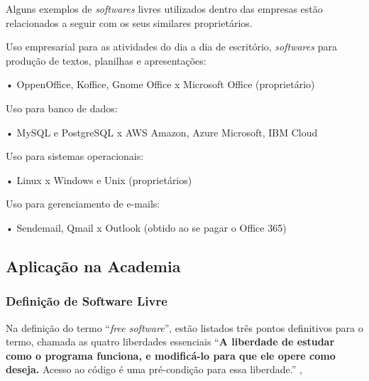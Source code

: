 \documentclass[12pt]{article}
\begin{document}
Alguns exemplos de \textit{softwares} livres utilizados dentro das empresas estão relacionados a seguir com os seus similares proprietários.

Uso empresarial para as atividades do dia a dia de escritório, \textit{softwares} para produção de textos, planilhas e apresentações:

• OppenOffice, Koffice, Gnome Office x Microsoft Office (proprietário)

Uso para banco de dados:

• MySQL e PostgreSQL x AWS Amazon, Azure Microsoft, IBM Cloud

Uso para sistemas operacionais:

• Linux x Windows e Unix (proprietários)

Uso para gerenciamento de e-mails:

• Sendemail, Qmail x Outlook (obtido ao se pagar o Office 365)













\subsection{Aplicação na Academia}

\subsubsection{Definição de Software Livre}

Na definição do termo ``\textit{free software}'', estão listados três pontos
definitivos para o termo, chamada as quatro liberdades essenciais ``\textbf{A liberdade de estudar como o programa funciona, e
  modificá-lo para que ele opere como deseja.} Acesso ao código é uma pré-condição para essa liberdade.'' \cite{gnu_what_is_open_source},

\end{document}
